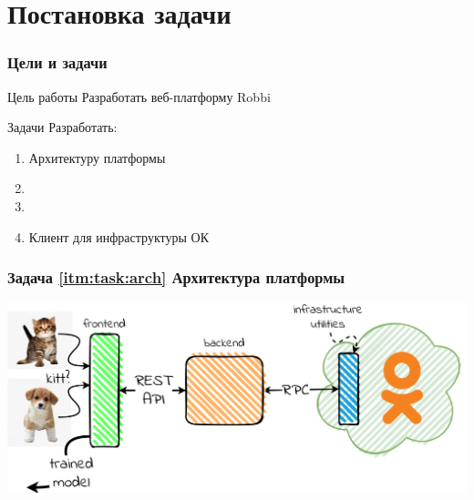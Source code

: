 \section{Постановка задачи}

\begin{frame}
\frametitle{Цели и задачи}
\begin{block}{Цель работы}
    Разработать веб-платформу Robbi
\end{block}

\bigskip
\pause

\begin{block}{Задачи}
    Разработать:
    \begin{enumerate}
        \item \label{itm:task:arch} Архитектуру платформы
        \item {}
        \item {}
        \item \label{itm:task:infra} Клиент для инфраструктуры ОК
    \end{enumerate}
\end{block}
\end{frame}

\begin{frame}
\frametitle{Задача \ref{itm:task:arch} Архитектура платформы}
\includegraphics[width=\textwidth]{architecture.png}
\end{frame}
